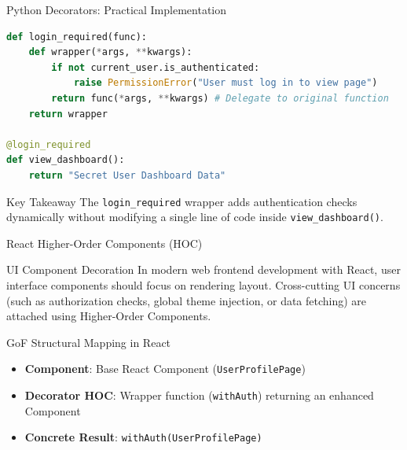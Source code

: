 \documentclass[aspectratio=169]{beamer}
\begin{document}

\begin{frame}[fragile]{Python Decorators: Practical Implementation}

\begin{lstlisting}[language=Python]
def login_required(func):
    def wrapper(*args, **kwargs):
        if not current_user.is_authenticated:
            raise PermissionError("User must log in to view page")
        return func(*args, **kwargs) # Delegate to original function
    return wrapper

@login_required
def view_dashboard():
    return "Secret User Dashboard Data"
\end{lstlisting}

\pause

\begin{block}{Key Takeaway}
The \texttt{login\_required} wrapper adds authentication checks dynamically without modifying a single line of code inside \texttt{view\_dashboard()}.
\end{block}

\end{frame}


\begin{frame}{React Higher-Order Components (HOC)}

\begin{block}{UI Component Decoration}
In modern web frontend development with React, user interface components should focus on rendering layout. Cross-cutting UI concerns (such as authorization checks, global theme injection, or data fetching) are attached using Higher-Order Components.
\end{block}

\pause

\begin{block}{GoF Structural Mapping in React}
\begin{itemize}
    \item \textbf{Component}: Base React Component (\texttt{UserProfilePage})
    \item \textbf{Decorator HOC}: Wrapper function (\texttt{withAuth}) returning an enhanced Component
    \item \textbf{Concrete Result}: \texttt{withAuth(UserProfilePage)}
\end{itemize}
\end{block}

\end{frame}
\end{document}
